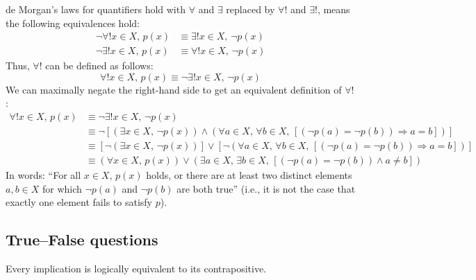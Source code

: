\begin{mysolution}
    de Morgan's laws for quantifiers hold with $\forall$ and $\exists$ replaced by $\forall !$ and $\exists !$, means the following equivalences hold:
    \begin{align*}
    \neg \forall ! x \in X,\, p(x) & \equiv \exists ! x \in X,\, \neg p(x)\\
    \neg \exists ! x \in X,\, p(x) & \equiv \forall ! x \in X,\, \neg p(x)
    \end{align*}
    Thus, $\forall !$ can be defined as follows:
    \[\forall ! x \in X,\, p(x) \equiv \neg \exists ! x \in X,\, \neg p(x)\]
    We can maximally negate the right-hand side to get an equivalent definition of $\forall !$:
    \begin{align*}
    \forall ! x \in X,\, p(x) & \equiv \neg \exists ! x \in X,\, \neg p(x)\\
    & \equiv \neg [(\exists x \in X,\, \neg p(x)) \wedge (\forall a \in X,\, \forall b \in X,\, [(\neg p(a)=\neg p(b)) \Rightarrow a=b])]\\
    & \equiv [\neg (\exists x \in X,\, \neg p(x))] \vee [\neg (\forall a \in X,\, \forall b \in X,\, [(\neg p(a)=\neg p(b)) \Rightarrow a=b])]\\
    & \equiv (\forall x \in X,\, p(x)) \vee (\exists a \in X,\, \exists b \in X,\, [(\neg p(a)=\neg p(b)) \wedge a \ne b])
    \end{align*}
    In words: ``For all $x \in X$, $p(x)$ holds, or there are at least two distinct elements $a, b \in X$ for which $\neg p(a)$ and $\neg p(b)$ are both true'' (i.e., it is not the case that exactly one element fails to satisfy $p$).
\end{mysolution}

\subsection*{True--False questions}


\begin{chapex} %
\label{cqLogicTFBegin}
Every implication is logically equivalent to its contrapositive.
\end{chapex}

